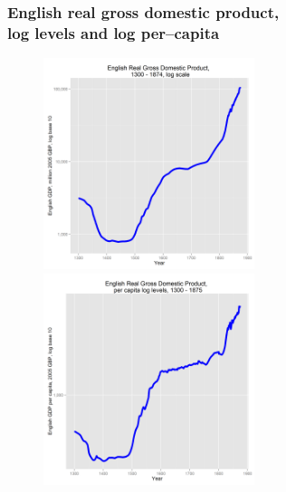 \documentclass[final]{beamer}
\begin{document}
\begin{frame}
		\frametitle{English real gross domestic product, \\
	log levels and log per--capita}

		\begin{figure}[p!]
		\label{fig:gdpLog}		
		\centerline{
		\mbox{\includegraphics[width=0.55\textwidth]{gdpLog}}
		\mbox{\includegraphics[width=0.55\textwidth]{gdpPopLog}}
		}
		\end{figure}
\end{frame}
\end{document}
